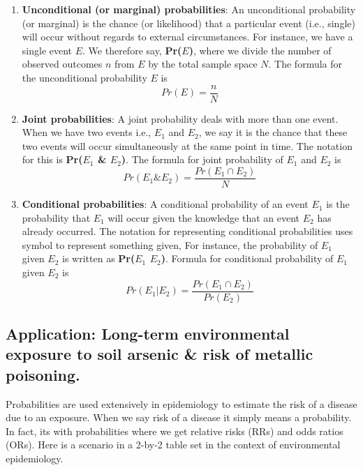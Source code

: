 \documentclass[
]{book}
\begin{document}
\begin{enumerate}
\def\labelenumi{\arabic{enumi}.}
\item
  \textbf{Unconditional (or marginal) probabilities}: An unconditional probability (or marginal) is the chance (or likelihood) that a particular event (i.e., single) will occur without regards to external circumstances. For instance, we have a single event \textbf{\(E\)}. We therefore say, \textbf{Pr(\(E\))}, where we divide the number of observed outcomes \textbf{\(n\)} from \textbf{\(E\)} by the total sample space \textbf{\(N\)}. The formula for the unconditional probability \textbf{\(E\)} is \[Pr(E)= \frac{n}{N}\]
\item
  \textbf{Joint probabilities}: A joint probability deals with more than one event. When we have two events i.e., \textbf{\(E_1\)} and \textbf{\(E_2\)}, we say it is the chance that these two events will occur simultaneously at the same point in time. The notation for this is \textbf{Pr(\(E_1\) \& \(E_2\))}. The formula for joint probability of \textbf{\(E_1\)} and \textbf{\(E_2\)} is \[Pr(E_1 \& E_2) =  \frac{Pr(E_1 \cap E_2)}{N}\]
\item
  \textbf{Conditional probabilities}: A conditional probability of an event \textbf{\(E_1\)} is the probability that \textbf{\(E_1\)} will occur given the knowledge that an event \textbf{\(E_2\)} has already occurred. The notation for representing conditional probabilities uses \textbf{\textbar{}} symbol to represent something given, For instance, the probability of \textbf{\(E_1\)} given \textbf{\(E_2\)} is written as \textbf{Pr(\(E_1\) \textbar{} \(E_2\))}. Formula for conditional probability of \textbf{\(E_1\)} given \textbf{\(E_2\)} is \[Pr(E_1 | E_2) = \frac{Pr(E_1 \cap E_2)}{Pr(E_2)}\]
\end{enumerate}

\hypertarget{application-long-term-environmental-exposure-to-soil-arsenic-risk-of-metallic-poisoning.}{%
\subsection{Application: Long-term environmental exposure to soil arsenic \& risk of metallic poisoning.}\label{application-long-term-environmental-exposure-to-soil-arsenic-risk-of-metallic-poisoning.}}

Probabilities are used extensively in epidemiology to estimate the risk of a disease due to an exposure. When we say risk of a disease it simply means a probability. In fact, its with probabilities where we get relative risks (RRs) and odds ratios (ORs). Here is a scenario in a 2-by-2 table set in the context of environmental epidemiology.
\end{document}
